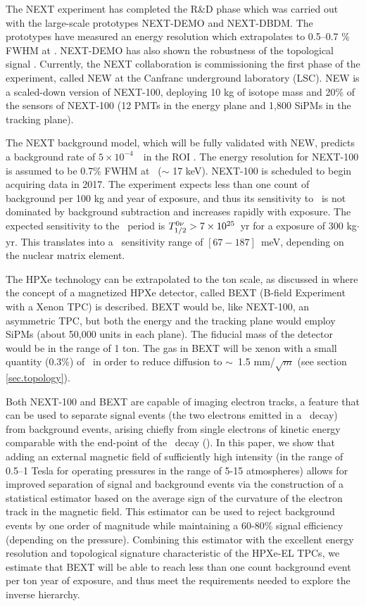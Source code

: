 \documentclass{JINST}
\begin{document}
The NEXT experiment has completed the R\&D phase which was carried out with the large-scale prototypes NEXT-DEMO and NEXT-DBDM. The prototypes have measured an energy resolution which extrapolates to 0.5--0.7 \% FWHM at \Qbb. NEXT-DEMO has also shown the robustness of the topological signal \cite{Alvarez:2012xda,Alvarez:2012kua,Alvarez:2013gxa,Lorca:2014sra}. Currently, the NEXT collaboration is commissioning the first phase of the experiment, called NEW at the Canfranc underground laboratory (LSC). NEW is a scaled-down version of NEXT-100, deploying 10 kg of isotope mass and 20\% of the sensors of NEXT-100 (12 PMTs in the energy plane and  1,800 SiPMs in the tracking plane).

The NEXT background model, which will be fully validated with NEW, predicts a background rate of $5 \times 10^{-4}$~\ckky\ in the ROI \cite{Nebot-Guinot:2014raa}. The energy resolution for NEXT-100 is assumed to be 0.7\% FWHM at \Qbb\ ($\sim$ 17 keV). NEXT-100 is scheduled to begin acquiring data in 2017. The experiment expects less than one count of background per 100 kg and year of exposure, and thus its sensitivity to \Tonu\ is not dominated by background subtraction and increases rapidly with exposure. The expected sensitivity to the \bbonu\ period is $T_{1/2}^{0\nu} > 7 \times 10^{25}$~yr for a exposure of 300 kg$\cdot$yr. This translates into a \mbb\ sensitivity range of $[67-187]$~meV, depending on the nuclear matrix element.

The HPXe technology can be extrapolated to the ton scale, as discussed in \cite{Gomez-Cadenas:2015bext} where the concept of a magnetized HPXe detector, called BEXT (B-field Experiment with a Xenon TPC) is described.  BEXT would be, like NEXT-100, an asymmetric TPC, but both the energy and the tracking plane would employ SiPMs (about 50,000 units in each plane). The fiducial mass of the detector would be in the range of 1 ton. The gas in BEXT will be xenon with a small quantity (0.3\%) of \COT\ in order to reduce diffusion to $\sim$~1.5 mm/$\sqrt{m}$ (see section \ref{sec.topology}).

Both NEXT-100 and BEXT are capable of imaging electron tracks, a feature that can be used to separate signal events (the two electrons emitted in a \bbonu\ decay) from background events, arising chiefly from single electrons of kinetic energy comparable with the end-point of the \bbonu\ decay (\Qbb). In this paper, we show that adding an external magnetic field of sufficiently high intensity (in the range of 0.5--1 Tesla for operating pressures in the range of 5-15 atmospheres) allows for improved separation of signal and background events via the construction of a statistical estimator based on the average sign of the curvature of the electron track in the magnetic field.  This estimator can be used to reject background events by one order of magnitude while maintaining a 60-80\% signal efficiency (depending on the pressure). Combining this estimator with the excellent energy resolution and topological signature characteristic of the HPXe-EL TPCs, we estimate that BEXT will be able to reach less than one count background event per ton year of exposure, and thus meet the requirements needed to explore the inverse hierarchy.
\end{document}
